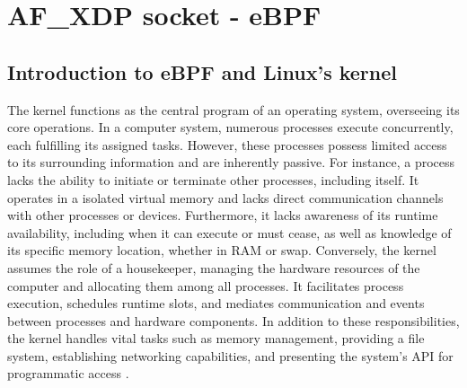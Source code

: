 \section{AF\_XDP socket - eBPF}
\subsection{Introduction to eBPF and Linux's kernel}
The kernel functions as the central program of an operating system, overseeing its core operations. 
In a computer system, numerous processes execute concurrently, each fulfilling its assigned tasks. 
However, these processes possess limited access to its surrounding information and are inherently passive.
For instance, a process lacks the ability to initiate or terminate other processes, including itself. 
It operates in a isolated virtual memory and lacks direct communication channels with other processes or devices. 
Furthermore, it lacks awareness of its runtime availability, including when it can execute or must cease, as well as knowledge of its specific memory location, whether in RAM or swap.
Conversely, the kernel assumes the role of a housekeeper, managing the hardware resources of the computer and allocating them among all processes. It facilitates process execution, schedules runtime slots, and mediates communication and events between processes and hardware components.
In addition to these responsibilities, the kernel handles vital tasks such as memory management, providing a file system, establishing networking capabilities, and presenting the system's \ac{API} for programmatic access \cite{kerrisk_linux_2010}.

